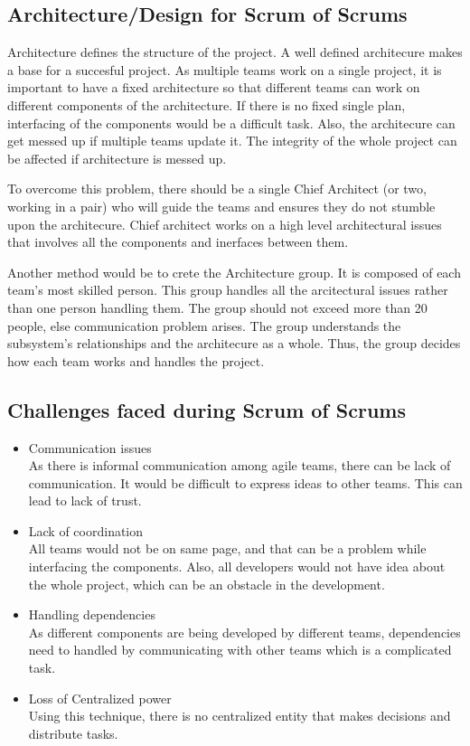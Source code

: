 \documentclass[sigconf]{acmart}
\begin{document}
\subsection{Architecture/Design for Scrum of Scrums }
Architecture defines the structure of the project. A well defined architecure makes a base for a succesful project. As multiple teams work on a single project, it is important to have a fixed architecture so that different teams can work on different components of the architecture. If there is no fixed single plan, interfacing of the components would be a difficult task. Also, the architecure can get messed up if multiple teams update it. The integrity of the whole project can be affected if architecture is messed up.


To overcome this problem, there should be a single Chief Architect (or two, working in a pair) who will guide the teams and ensures they do not stumble upon the architecure. Chief architect works on a high level architectural issues that involves all the components and inerfaces between them. 


Another method would be to crete the Architecture group. It is composed of each team's most skilled person. This group handles all the arcitectural issues rather than one person handling them. The group should not exceed more than 20 people, else communication problem arises. The group understands the subsystem's relationships and the architecure as a whole. Thus, the group decides how each team works and handles the project. 

\subsection{Challenges faced during Scrum of Scrums}
\begin{itemize}
\item Communication issues
\\As there is informal communication among agile teams, there can be lack of communication. It would be difficult to express ideas to other teams. This can lead to lack of trust.

\item Lack of coordination
\\All teams would not be on same page, and that can be a problem while interfacing the components. Also, all developers would not have idea about the whole project, which can be an obstacle in the development. 

\item Handling dependencies
\\As different components are being developed by different teams, dependencies need to handled by communicating with other teams which is a complicated task. 

\item Loss of Centralized power
\\Using this technique, there is no centralized entity that makes decisions and distribute tasks.
\end{itemize}
\end{document}
